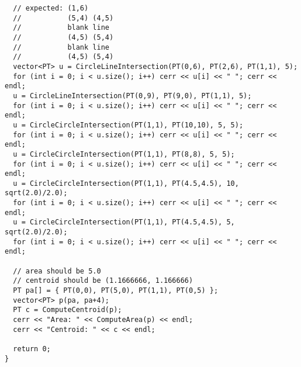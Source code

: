 \begin{lstlisting}
  // expected: (1,6)
  //           (5,4) (4,5)
  //           blank line
  //           (4,5) (5,4)
  //           blank line
  //           (4,5) (5,4)
  vector<PT> u = CircleLineIntersection(PT(0,6), PT(2,6), PT(1,1), 5);
  for (int i = 0; i < u.size(); i++) cerr << u[i] << " "; cerr << endl;
  u = CircleLineIntersection(PT(0,9), PT(9,0), PT(1,1), 5);
  for (int i = 0; i < u.size(); i++) cerr << u[i] << " "; cerr << endl;
  u = CircleCircleIntersection(PT(1,1), PT(10,10), 5, 5);
  for (int i = 0; i < u.size(); i++) cerr << u[i] << " "; cerr << endl;
  u = CircleCircleIntersection(PT(1,1), PT(8,8), 5, 5);
  for (int i = 0; i < u.size(); i++) cerr << u[i] << " "; cerr << endl;
  u = CircleCircleIntersection(PT(1,1), PT(4.5,4.5), 10, sqrt(2.0)/2.0);
  for (int i = 0; i < u.size(); i++) cerr << u[i] << " "; cerr << endl;
  u = CircleCircleIntersection(PT(1,1), PT(4.5,4.5), 5, sqrt(2.0)/2.0);
  for (int i = 0; i < u.size(); i++) cerr << u[i] << " "; cerr << endl;
  
  // area should be 5.0
  // centroid should be (1.1666666, 1.166666)
  PT pa[] = { PT(0,0), PT(5,0), PT(1,1), PT(0,5) };
  vector<PT> p(pa, pa+4);
  PT c = ComputeCentroid(p);
  cerr << "Area: " << ComputeArea(p) << endl;
  cerr << "Centroid: " << c << endl;
  
  return 0;
}

\end{lstlisting}